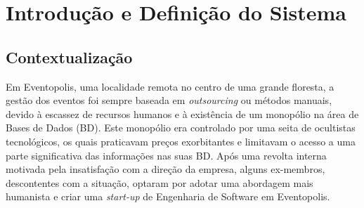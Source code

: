 \documentclass[a4paper,12pt]{scrreprt}
\begin{document}
\pagebreak



\renewcommand{\contentsname}{Índice}

\tableofcontents

\pagebreak

\listoffigures

\pagebreak

\listoftables

\pagebreak





\chapter{Introdução e Definição do Sistema}
     \section{Contextualização}

     Em Eventopolis, uma localidade remota no centro de uma grande floresta,
     a gestão dos eventos foi sempre baseada em \textit{outsourcing} ou métodos manuais,
     devido à escassez de recursos humanos e à existência de um monopólio na área de Bases
     de Dados (BD). Este monopólio era controlado por uma seita de ocultistas tecnológicos,
     os quais praticavam preços exorbitantes e limitavam o acesso a uma parte significativa
     das informações nas suas BD. Após uma revolta interna motivada pela insatisfação com a
     direção da empresa, alguns ex-membros, descontentes com a situação, optaram por adotar
     uma abordagem mais humanista e criar uma \textit{start-up} de Engenharia de Software em Eventopolis.
    
\end{document}
